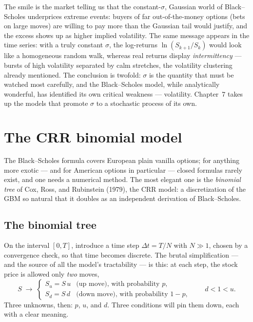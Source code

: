 The smile is the market telling us that the constant-$\sigma$, Gaussian world of Black--Scholes underprices extreme events: buyers of far out-of-the-money options (bets on large moves) are willing to pay more than the Gaussian tail would justify, and the excess shows up as higher implied volatility.
The same message appears in the time series: with a truly constant $\sigma$, the log-returns $\ln(S_{k+1}/S_k)$ would look like a homogeneous random walk, whereas real returns display \emph{intermittency} --- bursts of high volatility separated by calm stretches, the volatility clustering already mentioned.
The conclusion is twofold: $\sigma$ is the quantity that must be watched most carefully, and the Black--Scholes model, while analytically wonderful, has identified its own critical weakness --- volatility.
Chapter~7 takes up the models that promote $\sigma$ to a stochastic process of its own.


\section{The CRR binomial model}\label{sec:crr}

The Black--Scholes formula covers European plain vanilla options; for anything more exotic --- and for American options in particular --- closed formulas rarely exist, and one needs a numerical method.
The most elegant one is the \emph{binomial tree} of Cox, Ross, and Rubinstein (1979)\cite{CRR1979}, the CRR model: a discretization of the GBM so natural that it doubles as an independent derivation of Black--Scholes.

\subsection{The binomial tree}\label{sec:binomial-tree}

On the interval $[0, T]$, introduce a time step $\Delta t = T/N$ with $N\gg1$, chosen by a convergence check, so that time becomes discrete.
The brutal simplification --- and the source of all the model's tractability --- is this: at each step, the stock price is allowed only \emph{two} moves,
\begin{equation}
S \;\longrightarrow\;
\begin{cases}
S_u = S\, u & \text{(up move), with probability } p, \\
S_d = S\, d & \text{(down move), with probability } 1-p,
\end{cases}
\qquad d < 1 < u.
\end{equation}
Three unknowns, then: $p$, $u$, and $d$.
Three conditions will pin them down, each with a clear meaning.

